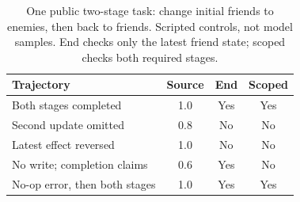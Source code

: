 \begin{table}[t]
\centering
\caption{One public two-stage task: change initial friends to enemies, then back to friends. Scripted controls, not model samples. End checks only the latest friend state; scoped checks both required stages.}
\label{tab:scope}
{\fontsize{9}{10.8}\selectfont
\setlength{\tabcolsep}{3.5pt}
\begin{tabular}{@{}lccc@{}}
\toprule
Trajectory & Source & End & Scoped\\
\midrule
Both stages completed &1.0&Yes&Yes\\
Second update omitted &0.8&No&No\\
Latest effect reversed &1.0&No&No\\
No write; completion claims &0.6&Yes&No\\
No-op error, then both stages &1.0&Yes&Yes\\
\bottomrule
\end{tabular}}
\end{table}
